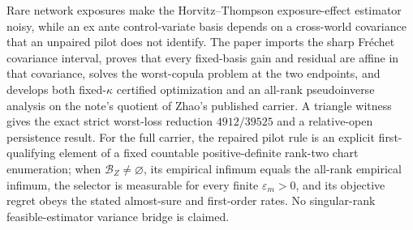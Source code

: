 Rare network exposures make the Horvitz--Thompson exposure-effect estimator noisy, while an ex ante control-variate basis depends on a cross-world covariance that an unpaired pilot does not identify.  The paper imports the sharp Fr\'echet covariance interval, proves that every fixed-basis gain and residual are affine in that covariance, solves the worst-copula problem at the two endpoints, and develops both fixed-\(\kappa\) certified optimization and an all-rank pseudoinverse analysis on the note's quotient of Zhao's published carrier.  A triangle witness gives the exact strict worst-loss reduction \(4912/39525\) and a relative-open persistence result.  For the full carrier, the repaired pilot rule is an explicit first-qualifying element of a fixed countable positive-definite rank-two chart enumeration; when \(\mathcal B_Z\ne\varnothing\), its empirical infimum equals the all-rank empirical infimum, the selector is measurable for every finite \(\varepsilon_m>0\), and its objective regret obeys the stated almost-sure and first-order rates.  No singular-rank feasible-estimator variance bridge is claimed.